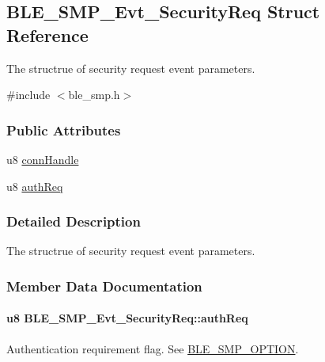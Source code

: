 \hypertarget{struct_b_l_e___s_m_p___evt___security_req}{}\subsection{B\+L\+E\+\_\+\+S\+M\+P\+\_\+\+Evt\+\_\+\+Security\+Req Struct Reference}
\label{struct_b_l_e___s_m_p___evt___security_req}


The structrue of security request event parameters.  




{\ttfamily \#include $<$ble\+\_\+smp.\+h$>$}

\subsubsection*{Public Attributes}
\begin{DoxyCompactItemize}
\item 
u8 \hyperlink{struct_b_l_e___s_m_p___evt___security_req_af2860c3b34e1627fb405397634d9dc3b}{conn\+Handle}
\item 
u8 \hyperlink{struct_b_l_e___s_m_p___evt___security_req_a79d1d614a3844555628c502714347a5d}{auth\+Req}
\end{DoxyCompactItemize}


\subsubsection{Detailed Description}
The structrue of security request event parameters. 

\subsubsection{Member Data Documentation}
\paragraph[{\texorpdfstring{auth\+Req}{authReq}}]{\setlength{\rightskip}{0pt plus 5cm}u8 B\+L\+E\+\_\+\+S\+M\+P\+\_\+\+Evt\+\_\+\+Security\+Req\+::auth\+Req}\hypertarget{struct_b_l_e___s_m_p___evt___security_req_a79d1d614a3844555628c502714347a5d}{}\label{struct_b_l_e___s_m_p___evt___security_req_a79d1d614a3844555628c502714347a5d}
Authentication requirement flag. See \hyperlink{group___b_l_e___s_m_p___o_p_t_i_o_n}{B\+L\+E\+\_\+\+S\+M\+P\+\_\+\+O\+P\+T\+I\+ON}. 
